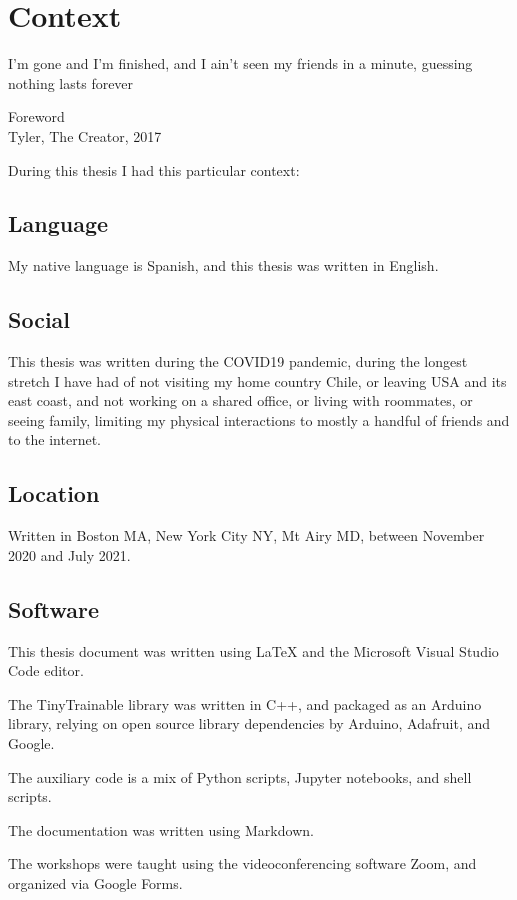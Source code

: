 \chapter{Context}

\epigraph{I'm gone and I'm finished, and I ain't seen my friends in a minute, guessing nothing lasts forever}{Foreword \\ Tyler, The Creator, 2017}

During this thesis I had this particular context:

\section{Language}

My native language is Spanish, and this thesis was written in English.

\section{Social}

This thesis was written during the COVID19 pandemic, during the longest stretch I have had of not visiting my home country Chile, or leaving USA and its east coast, and not working on a shared office, or living with roommates, or seeing family, limiting my physical interactions to mostly a handful of friends and to the internet.

\section{Location}

Written in Boston MA, New York City NY, Mt Airy MD, between November 2020 and July 2021.

\section{Software}

This thesis document was written using LaTeX and the Microsoft Visual Studio Code editor.

The TinyTrainable library was written in C++, and packaged as an Arduino library, relying on open source library dependencies by Arduino, Adafruit, and Google.

The auxiliary code is a mix of Python scripts, Jupyter notebooks, and shell scripts.

The documentation was written using Markdown.

The workshops were taught using the videoconferencing software Zoom, and organized via Google Forms.

